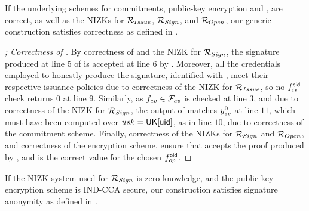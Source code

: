 \begin{theorem}
  \label{thm:correctness-uas}
  If the underlying schemes for commitments, public-key encryption and \SBCM,
  are correct,
  as well as the NIZKs for $\mathcal{R}_{Issue}$, $\mathcal{R}_{Sign}$, and
  $\mathcal{R}_{Open}$, our generic construction \CUASGen satisfies correctness as
  defined in .
\end{theorem}

\begin{proof}[; Correctness of \CUASGen]
  By correctness of \SBCM and the NIZK for $\mathcal{R}_{Sign}$, the signature
  produced at line 5 of \ExpCorrect is accepted at line 6 by \Verify.
  Moreover, all the credentials employed to honestly produce the signature,
  identified with \scid, meet their respective issuance policies due to
  correctness of the NIZK for $\mathcal{R}_{Issue}$, so no $f_{is}^\mathsf{cid}$ check
  returns $0$ at line 9. Similarly, as $f_{ev} \in \mathcal{F}_{ev}$ is checked at
  line 3, and due to correctness of the NIZK for $\mathcal{R}_{Sign}$, the
  output of \feval matches $y_{ev}^0$ at line $11$, which must have been
  computed over $usk=\mathsf{UK}[\mathsf{uid}]$, as in line $10$, due to correctness of the
  commitment scheme. Finally, correctness of the NIZKs for $\mathcal{R}_{Sign}$
  and $\mathcal{R}_{Open}$, and correctness of the encryption scheme, ensure that
  \Judge accepts the proof produced by \Open, and \yinsp is the correct value
  for the chosen $f_{op}^{\mathsf{oid}}$.
\end{proof}

\begin{theorem}
  \label{thm:sign-anonymity-uas}
  If the NIZK system used for $\mathcal{R}_{Sign}$ is zero-knowledge, and the
  public-key encryption scheme is IND-CCA secure, our \CUASGen construction
  satisfies signature anonymity as defined in .
\end{theorem}

